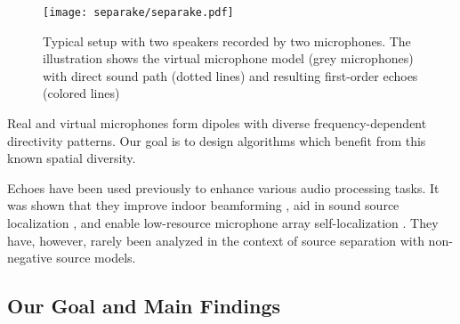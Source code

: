 \begin{figure}
    \centering
    \texttt{[image: separake/separake.pdf]}
    \caption{Typical setup with two speakers recorded by two microphones. The illustration shows the virtual microphone model (grey microphones) with direct sound path (dotted lines) and resulting first-order echoes (colored lines)}
    \label{fig:separake:setup}
    \vspace{-0mm}
\end{figure}

Real and virtual microphones form dipoles with diverse frequency-dependent directivity patterns.
Our goal is to design algorithms which benefit from this known spatial diversity.


Echoes have been used previously to enhance various audio processing tasks.
It was shown that they improve indoor beamforming \cite{Dokmanic:2015dr, Scheibler:2015ii, RobinThesis},
aid in sound source localization \cite{Ribeiro:2010uj},
and enable low-resource microphone array self-localization \cite{Dokmanic:2016gu}.
They have, however, rarely been analyzed in the context of source separation with non-negative source models.

\subsection{Our Goal and Main Findings}

